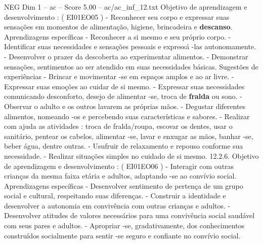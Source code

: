\begin{textsample}{NEG Dim 1 – ac – Score 5.00 – ac/ac\_inf\_12.txt}
Objetivo de aprendizagem e desenvolvimento : ( EI01EO05 ) - Reconhecer seu corpo e expressar suas sensações em momentos de alimentação, higiene, brincadeira e \textbf{descanso}.
Aprendizagens específicas - Reconhecer a si mesmo e seu próprio corpo. - Identificar suas necessidades e sensações pessoais e expressá -las autonomamente. - Desenvolver o prazer da descoberta ao experimentar alimentos. - Demonstrar sensações, sentimentos ao ser atendido em suas necessidades básicas.
Sugestões de experiências - Brincar e movimentar -se em espaços amplos e ao ar livre. - Expressar suas emoções ao cuidar de si mesmo. - Expressar suas necessidades comunicando desconforto, desejo de alimentar -se, troca de \textbf{fralda} ou sono. - Observar o adulto e os outros lavarem as próprias mãos. - Degustar diferentes alimentos, nomeando -os e percebendo suas características e sabores. - Realizar com ajuda as atividades : troca de fralda/roupa, escovar os dentes, usar o sanitário, pentear os cabelos, alimentar -se, lavar e enxugar as mãos, banhar -se, beber água, dentre outras. - Usufruir de relaxamento e repouso conforme sua necessidade. - Realizar situações simples no cuidado de si mesmo. 12.2.6.
Objetivo de aprendizagem e desenvolvimento : ( EI01EO06 ) - Interagir com outras crianças da mesma faixa etária e adultos, adaptando -se ao convívio social.
Aprendizagens específicas - Desenvolver sentimento de pertença de um grupo social e cultural, respeitando suas diferenças. - Construir a identidade e desenvolver a autonomia em convivência com outras crianças e adultos. - Desenvolver atitudes de valores necessários para uma convivência social saudável com seus pares e adultos. - Apropriar -se, gradativamente, dos conhecimentos construídos socialmente para sentir -se seguro e confiante no convívio social.

\end{textsample}
